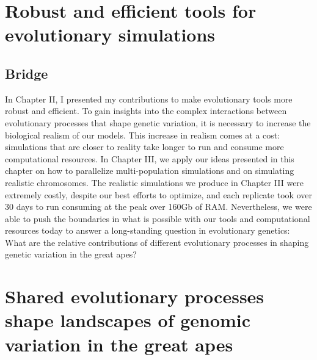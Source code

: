 







\chapter{Robust and efficient tools for evolutionary simulations} \label{chapter:tools}


\newpage
\section{Bridge}
In Chapter II, I presented my contributions to make evolutionary tools more robust and efficient.
To gain insights into the complex interactions between evolutionary processes that shape genetic variation, 
it is necessary to increase the biological realism of our models.
This increase in realism comes at a cost: simulations that are closer to reality take longer to run and consume more computational resources.
In Chapter III, we apply our ideas presented in this chapter on how to parallelize multi-population simulations and on simulating realistic chromosomes.
The realistic simulations we produce in Chapter III were extremely costly, despite our best efforts to optimize, and each replicate took over 30 days to run consuming at the peak over 160Gb of RAM.
Nevertheless, we were able to push the boundaries in what is possible with our tools and computational resources today to answer a long-standing question in evolutionary genetics: What are the relative contributions of different evolutionary processes in shaping genetic variation in the great apes?

\chapter{Shared evolutionary processes shape landscapes of genomic variation in the great apes} \label{chapter:greatapes}


\newpage
